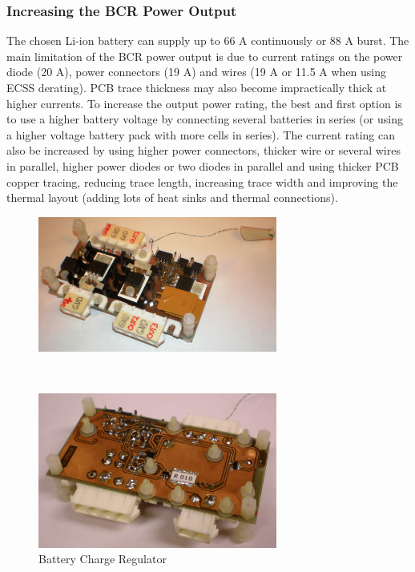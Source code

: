 \subsubsection*{Increasing the BCR Power Output}
The chosen Li-ion battery can supply up to 66 A continuously or 88 A burst. The main limitation of the \ac{BCR} power output is due to current ratings on the power diode (20 A), power connectors (19 A) and wires (19 A or 11.5 A when using ECSS derating\cite{ECSS_derating}). PCB trace thickness may also become impractically thick at higher currents. 
To increase the output power rating, the best and first option is to use a higher battery voltage by connecting several batteries in series (or using a higher voltage battery pack with more cells in series). 
The current rating can also be increased by using higher power connectors, thicker wire or several wires in parallel, higher power diodes or two diodes in parallel and using thicker PCB copper tracing, reducing trace length, increasing trace width and improving the thermal layout (adding lots of heat sinks and thermal connections).
%
%
%
\begin{figure}[H]
\begin{minipage}[t]{\linewidth}
\centering
\includegraphics[width=0.7\textwidth]{figures/fig_BCR_top}
\end{minipage}
\\[1mm]
\begin{minipage}[t]{\linewidth}
\centering
\includegraphics[width=0.7\textwidth]{figures/fig_BCR_bottom}
\end{minipage}
\caption{Battery Charge Regulator}
\label{fig:BCR_top_bottom}
\end{figure}
